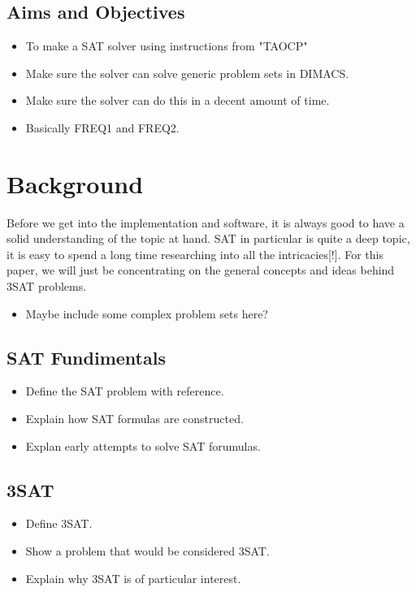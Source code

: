 \documentclass{article}
\begin{document}
\subsection{Aims and Objectives}
\begin{itemize}
    \item To make a SAT solver using instructions from "TAOCP"
    \item Make sure the solver can solve generic problem sets in DIMACS.
    \item Make sure the solver can do this in a decent amount of time.
    \item Basically FREQ1 and FREQ2.
\end{itemize}

\section{Background}
Before we get into the implementation and software, it is always good to have a solid understanding
of the topic at hand. SAT in particular is quite a deep topic, it is easy to spend a long time
researching into all the intricacies[!]. For this paper, we will just be concentrating on the
general concepts and ideas behind 3SAT problems.

\begin{itemize}
    \item Maybe include some complex problem sets here?
\end{itemize}


\subsection{SAT Fundimentals}
\begin{itemize}
    \item Define the SAT problem with reference.
    \item Explain how SAT formulas are constructed.
    \item Explan early attempts to solve SAT forumulas.
\end{itemize}

\subsection{3SAT}
\begin{itemize}
    \item Define 3SAT.
    \item Show a problem that would be considered 3SAT.
    \item Explain why 3SAT is of particular interest.
\end{itemize}
\end{document}
